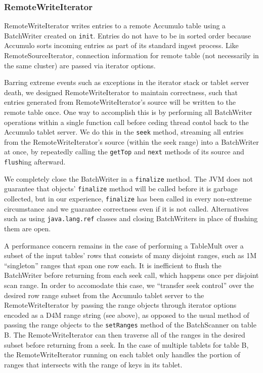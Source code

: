 \subsubsection{RemoteWriteIterator}
RemoteWriteIterator writes entries to a remote Accumulo table using a BatchWriter created on \texttt{init}.
Entries do not have to be in sorted order because Accumulo sorts incoming entries as part of its
standard ingest process. Like RemoteSourceIterator, connection information for remote table
(not necessarily in the same cluster) are passed via iterator options.

Barring extreme events such as exceptions in the iterator stack or tablet server death,
we designed RemoteWriteIterator to maintain correctness, such that entries generated from
RemoteWriteIterator's source will be written to the remote table once.
One way to accomplish this is by performing all BatchWriter operations within a single function call
before ceding thread contol back to the Accumulo tablet server.  We do this in the \texttt{seek} method,
streaming all entries from the RemoteWriteIterator's source (within the seek range) into a BatchWriter at once, 
by repeatedly calling the \texttt{getTop} and \texttt{next} methods of its source and \texttt{flush}ing afterward.

We completely close the BatchWriter in a \texttt{finalize} method.
The JVM does not guarantee that objects' \texttt{finalize} method will be called before it is 
garbage collected, but in our experience, \texttt{finalize} has been called in every non-extreme circumstance
and we guarantee correctness even if it is not called. Alternatives such as using \texttt{java.lang.ref}
classes and closing BatchWriters in place of flushing them are open.

A performance concern remains in the case of performing a TableMult over a subset of the input tables' rows 
that consists of many disjoint ranges, such as 1M ``singleton'' ranges that span one row each.
It is inefficient to flush the BatchWriter before returning from each seek call, which happens once per 
disjoint scan range.  In order to accomodate this case, we ``transfer seek control'' over the desired row range
subset from the Accumulo tablet server to the RemoteWriteIterator by passing the range objects through 
iterator options encoded as a D4M range string (see above), as opposed to the usual method of 
passing the range objects to the \texttt{setRanges} method of the BatchScanner on table B.
The RemoteWriteIterator can then traverse all of the ranges in the desired subset before returning from a seek.
In the case of multiple tablets for table B, the RemoteWriteIterator running on each tablet only handles 
the portion of ranges that intersects with the range of keys in its tablet.

